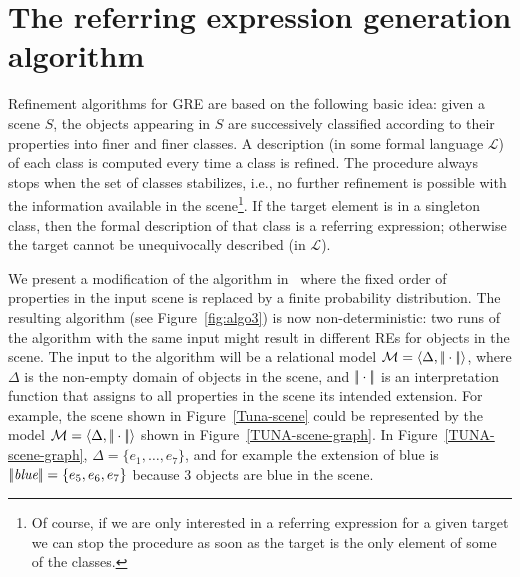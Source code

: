 \section{The referring expression generation algorithm} \label{sec:algorithm}

Refinement algorithms for GRE are based on the following basic idea: given a 
scene $S$, the objects appearing in $S$ are successively classified according
to their properties into finer and finer classes. A description (in some formal language $\mathcal{L}$) of each 
class is computed every time a class is refined. The procedure always stops when the 
set of classes stabilizes, i.e., no further refinement is possible with the information 
available in the scene\footnote{Of course, if we are only interested in a referring expression for 
a given target we can stop the procedure as soon as the target is the only element of some of the classes.}.  If the target element is in a singleton class, then the formal description of that class is a referring expression; otherwise the 
target cannot be unequivocally described (in $\mathcal{L}$).  

We present a modification of the algorithm in~\cite{arec2:2008:Areces} where the fixed order of properties in the 
input scene is replaced by a finite probability distribution. 
The resulting algorithm (see Figure~\ref{fig:algo3}) is now non-deterministic: two runs of the algorithm with the same 
input might result in different REs for objects in the scene.
The input to the algorithm will be a relational model $\mathcal{M} = \langle \Delta, |\!|\cdot|\!| \rangle$,
where $\Delta$ is the non-empty domain of objects in the scene, and $|\!|\cdot|\!|$ is an 
interpretation function that assigns to all properties in the scene its intended extension.  For example, 
the scene shown in Figure~\ref{Tuna-scene} could be represented by the model $\mathcal{M}=\langle \Delta,|\!|\cdot|\!| \rangle$ shown in Figure~\ref{TUNA-scene-graph}. In Figure~\ref{TUNA-scene-graph}, $\Delta = \{e_1,\ldots,e_7\}$, and for example the extension of blue is $|\!|\emph{blue}|\!| = \{e_5,e_6,e_7\}$ because 3 objects are blue in the scene.

